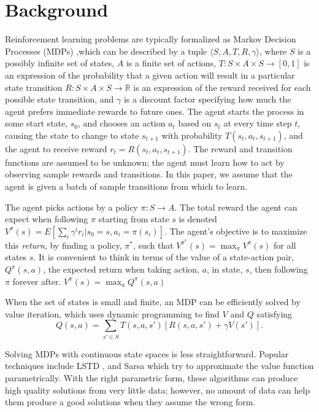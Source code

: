 \documentclass{article} %
\begin{document}
\section{Background}

Reinforcement learning \cite{rlai} problems are typically formalized as 
Markov Decision Processes (MDPs) \cite{put},which can be described
by a tuple $\langle S,A,T,R,\gamma\rangle$, where
$S$ is a possibly infinite set of states, $A$ is a finite set of actions,
$T:S\times A\times S\to[0,1]$ is an expression of the probability
that a given action will result in a particular state transition
$R:S\times A\times S\to\mathbb{R}$ is an expression of the reward received
for each possible state transition, and
$\gamma$ is a discount factor specifying how much the agent prefers immediate
rewards to future ones.
The agent starts the process in some
start state, $s_0$, and chooses an action $a_t$ based on $s_t$ at every
time step $t$, causing the state to change to state $s_{t+1}$ with
probability $T(s_t,a_t,s_{t+1})$, and the agent to receive reward 
 $r_t = R(s_t,a_t,s_{t+1})$. 
The reward and transition functions are assumed to
be unknown; the agent must learn how to act by observing sample
rewards and transitions.
In this paper, we assume that the agent is given a batch of sample
transitions from which to learn.

The agent picks actions by a policy $\pi:S\to A$.
The total reward the agent can expect 
when following $\pi$ starting from state $s$ is denoted
$V^\pi(s) = E\left[\sum_i\gamma^i r_i|s_0 = s, a_i=\pi(s_i)\right]$.
The agent's objective is to maximize this \textit{return}, by finding
a policy, $\pi^*$, such that
$V^{\pi^*}(s) = \max_\pi V^\pi(s)$ for all states $s$.
It is convenient to think in terms of
the value of a state-action pair, $Q^{\pi}(s,a)$,
the expected return when taking action, $a$, in state, $s$,
then following $\pi$ forever after. $V^\pi(s) = \max_a Q^\pi(s,a)$

When the set of states is small and finite, an MDP can be efficiently solved
by value iteration, which uses dynamic programming to find $V$ and $Q$ satisfying
$$Q(s,a) = \sum_{s' \in S} T(s,a,s')\left[R(s,a,s') + \gamma V(s')\right].$$

Solving MDPs with continuous state spaces is less straightforward.
Popular techniques include LSTD \cite{lstd}, and Sarsa \cite{sarsa}
which try to approximate the value function parametrically.
With the right parametric form, these algorithms can produce high quality solutions
from very little data; however, no amount of data can help them produce a good
solutions when they assume the wrong form.
\end{document}

